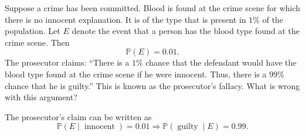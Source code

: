 \begin{example}
	Suppose a crime has been committed. Blood is found at the crime scene for which there is no innocent explanation. It is of the type that is present in $1\%$ of the population. Let $E$ denote the event that a person has the blood type found at the crime scene. Then
	\begin{equation}
		\mathbb{P}(E) = 0.01.
		\label{eq:proseca}
	\end{equation}
	The prosecutor claims: ``There is a $1\%$ chance that the defendant would have the blood type found at the crime scene if he were innocent. Thus, there is a $99\%$ chance that he is guilty.'' This is known as the prosecutor's fallacy. What is wrong with this argument?\newline
	
	The prosecutor's claim can be written as
	\begin{equation}
		\mathbb{P}(E \mid \operatorname{innocent}) = 0.01 \Rightarrow \mathbb{P}(\operatorname{guilty} \mid E) = 0.99.
		\label{eq:prosec1}
	\end{equation}		
	

\end{example}
